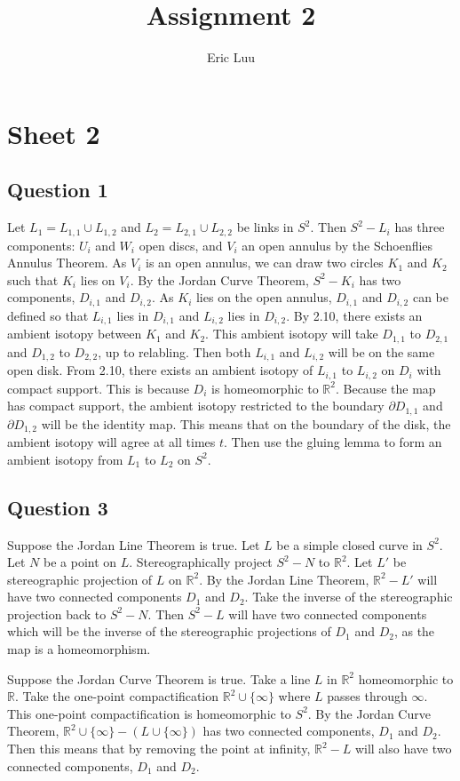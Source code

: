 \documentclass{article}
\title{Assignment 2}
\author{Eric Luu}
\theoremstyle{definition}
\numberwithin{theorem}{section}
\numberwithin{equation}{section}
\begin{document}
\section{Sheet 2}

\subsection{Question 1}
Let $L_1 = L_{1,1} \cup L_{1,2}$ and $L_2 = L_{2,1} \cup L_{2,2}$ be links in $S^2$. Then $S^2 - L_i$ has three components: $U_i$ and $W_i$ open discs, and $V_i$ an open annulus by the Schoenflies Annulus Theorem. As $V_i$ is an open annulus, we can draw two circles $K_1$ and $K_2$ such that $K_i$ lies on $V_i$. By the Jordan Curve Theorem, $S^2 - K_i$ has two components, $D_{i, 1}$ and $D_{i, 2}$. As $K_i$ lies on the open annulus, $D_{i, 1}$ and $D_{i, 2}$ can be defined so that $L_{i, 1}$ lies in $D_{i, 1}$ and $L_{i, 2}$ lies in $D_{i, 2}$.
By 2.10, there exists an ambient isotopy between $K_1$ and $K_2$. This ambient isotopy will take $D_{1,1}$ to $D_{2,1}$ and $D_{1,2}$ to $D_{2,2}$, up to relabling. Then both $L_{i,1}$ and $L_{i,2}$ will be on the same open disk. From 2.10, there exists an ambient isotopy of $L_{i, 1}$ to $L_{i, 2}$ on $D_i$ with compact support. This is because $D_i$ is homeomorphic to $\mathbb{R}^2$. Because the map has compact support, the ambient isotopy restricted to the boundary $\partial D_{1,1}$ and $\partial D_{1,2}$ will be the identity map. This means that on the boundary of the disk, the ambient isotopy will agree at all times $t$. Then use the gluing lemma to form an ambient isotopy from $L_1$ to $L_2$ on $S^2$. 

\subsection{Question 3}
Suppose the Jordan Line Theorem is true. Let $L$ be a simple closed curve in $S^2$. Let $N$ be a point on $L$. Stereographically project $S^2 - N$ to $\mathbb{R}^2$. Let $L'$ be stereographic projection of $L$ on $\mathbb{R}^2$. By the Jordan Line Theorem, $\mathbb{R}^2 - L'$ will have two connected components $D_1$ and $D_2$. Take the inverse of the stereographic projection back to $S^2 - N$. Then $S^2 - L$ will have two connected components which will be the inverse of the stereographic projections of $D_1$ and $D_2$, as the map is a homeomorphism. 

Suppose the Jordan Curve Theorem is true. Take a line $L$ in $\mathbb{R}^2$ homeomorphic to $\mathbb{R}$. Take the one-point compactification $\mathbb{R}^2 \cup \{\infty\}$ where $L$ passes through $\infty$. This one-point compactification is homeomorphic to $S^2$. By the Jordan Curve Theorem, $\mathbb{R}^2 \cup \{\infty\} - (L \cup \{\infty \})$ has two connected components, $D_1$ and $D_2$. Then this means that by removing the point at infinity, $\mathbb{R}^2 - L$ will also have two connected components, $D_1$ and $D_2$. 
\end{document}
